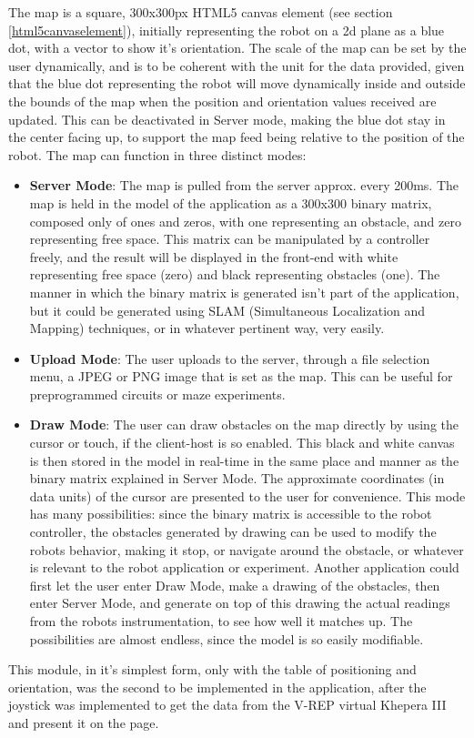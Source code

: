 The map is a square, 300x300px HTML5 canvas element (see section \ref{html5canvaselement}), initially representing the robot 
on a 2d plane as a blue dot, with a vector to show it's orientation. The scale of the map can be set by the user dynamically, 
and is to be coherent with the unit for the data provided, given that the blue dot representing the robot will move 
dynamically inside and outside the bounds of the map when the position and orientation values received are updated. This can 
be deactivated in Server mode, making the blue dot stay in the center facing up, to support the map feed being relative to the 
position of the robot. The map can function in three distinct modes:
\begin{itemize}
	\item \textbf{Server Mode}: The map is pulled from the server approx. every 200ms. The map is held in the model of the 
	application as a 300x300 binary matrix, composed only of ones and zeros, with one representing an obstacle, and zero 
	representing free space. This matrix can be manipulated by a controller freely, and the result will be displayed in the 
	front-end with white representing free space (zero) and black representing obstacles (one). The manner in which the binary 
	matrix is generated isn't part of the application, but it could be generated using SLAM (Simultaneous Localization and 
	Mapping) techniques, or in whatever pertinent way, very easily.
	\item \textbf{Upload Mode}: The user uploads to the server, through a file selection menu, a JPEG or PNG image that is set 
	as the map. This can be useful for preprogrammed circuits or maze experiments.
	\item \textbf{Draw Mode}: The user can draw obstacles on the map directly by using the cursor or touch, if the client-host 
	is so enabled. This black and white canvas is then stored in the model in real-time in the same place and manner as the 
	binary matrix explained in Server Mode. The approximate coordinates (in data units) of the cursor are presented to the 
	user for convenience. This mode has many possibilities: since the binary matrix is accessible to the robot controller, the 
	obstacles generated by drawing can be used to modify the robots behavior, making it stop, or navigate around the obstacle, 
	or whatever is relevant to the robot application or experiment. Another application could first let the user enter Draw 
	Mode, make a drawing of the obstacles, then enter Server Mode, and generate on top of this drawing the actual readings 
	from the robots instrumentation, to see how well it matches up. The possibilities are almost endless, since the model is 
	so easily modifiable.
\end{itemize}
This module, in it's simplest form, only with the table of positioning and orientation, was the second to be implemented in 
the application, after the joystick was implemented to get the data from the V-REP virtual Khepera III and present it on the 
page.\\


